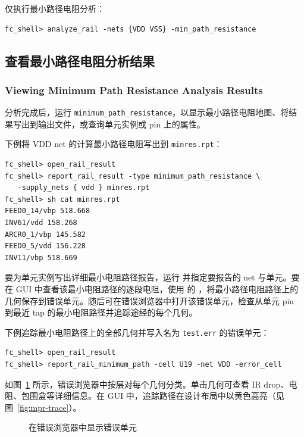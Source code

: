 仅执行最小路径电阻分析：
\begin{lstlisting}
fc_shell> analyze_rail -nets {VDD VSS} -min_path_resistance
\end{lstlisting}

\subsection{查看最小路径电阻分析结果}
\subsubsection*{Viewing Minimum Path Resistance Analysis Results}

分析完成后，运行   \texttt{minimum\_path\_resistance}，以显示最小路径电阻地图、将结果写出到输出文件，或查询单元实例或 pin 上的属性。

下例将 VDD net 的计算最小路径电阻写出到 \texttt{minres.rpt}：
\begin{lstlisting}
fc_shell> open_rail_result
fc_shell> report_rail_result -type minimum_path_resistance \
   -supply_nets { vdd } minres.rpt
fc_shell> sh cat minres.rpt
FEED0_14/vbp 518.668
INV61/vdd 158.268
ARCR0_1/vbp 145.582
FEED0_5/vdd 156.228
INV11/vbp 518.669
\end{lstlisting}

要为单元实例写出详细最小电阻路径报告，运行  并指定要报告的 net 与单元。要在 GUI 中查看该最小电阻路径的逐段电阻，使用  的 ，将最小路径电阻路径上的几何保存到错误单元。随后可在错误浏览器中打开该错误单元，检查从单元 pin 到最近 tap 的最小电阻路径并追踪途经的每个几何。

下例追踪最小电阻路径上的全部几何并写入名为 \texttt{test.err} 的错误单元：
\begin{lstlisting}
fc_shell> open_rail_result
fc_shell> report_rail_minimum_path -cell U19 -net VDD -error_cell
\end{lstlisting}

如图~\ref{fig:mpr-err} 所示，错误浏览器中按层对每个几何分类。单击几何可查看 IR drop、电阻、包围盒等详细信息。在 GUI 中，追踪路径在设计布局中以黄色高亮（见图~\ref{fig:mpr-trace}）。

\begin{figure}[htbp]
\centering
{}
\caption{在错误浏览器中显示错误单元}
\label{fig:mpr-err}
\end{figure}

